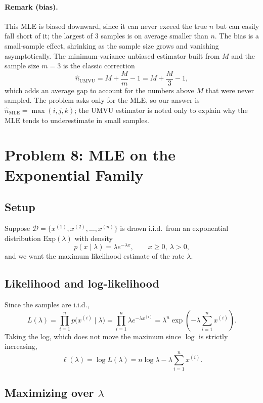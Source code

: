 \documentclass[11pt]{article}
\begin{document}
\paragraph{Remark (bias).} This MLE is biased downward, since it can never
exceed the true $n$ but can easily fall short of it; the largest of $3$ samples
is on average smaller than $n$. The bias is a small-sample effect, shrinking as
the sample size grows and vanishing asymptotically. The minimum-variance
unbiased estimator built from $M$ and the sample size $m=3$ is the classic
correction
\[
  \hat n_{\mathrm{UMVU}} = M + \frac{M}{m} - 1 = M + \frac{M}{3} - 1,
\]
which adds an average gap to account for the numbers above $M$ that were never
sampled. The problem asks only for the MLE, so our answer is
$\hat n_{\mathrm{MLE}} = \max(i,j,k)$; the UMVU estimator is noted only to
explain why the MLE tends to underestimate in small samples.

\newpage
\section{Problem 8: MLE on the Exponential Family}

\subsection*{Setup}

Suppose $\mathcal{D} = \{x^{(1)}, x^{(2)}, \dots, x^{(n)}\}$ is drawn i.i.d.\
from an exponential distribution $\mathrm{Exp}(\lambda)$ with density
\[
  p(x \mid \lambda) = \lambda e^{-\lambda x}, \qquad x \ge 0,\ \lambda > 0,
\]
and we want the maximum likelihood estimate of the rate $\lambda$.

\subsection*{Likelihood and log-likelihood}

Since the samples are i.i.d.,
\[
  L(\lambda) = \prod_{i=1}^{n} p\big(x^{(i)} \mid \lambda\big)
  = \prod_{i=1}^{n} \lambda e^{-\lambda x^{(i)}}
  = \lambda^n \exp\!\left(-\lambda \sum_{i=1}^{n} x^{(i)}\right).
\]
Taking the log, which does not move the maximum since $\log$ is strictly
increasing,
\[
  \ell(\lambda) = \log L(\lambda)
  = n \log \lambda - \lambda \sum_{i=1}^{n} x^{(i)}.
\]

\subsection*{Maximizing over $\lambda$}
\end{document}
